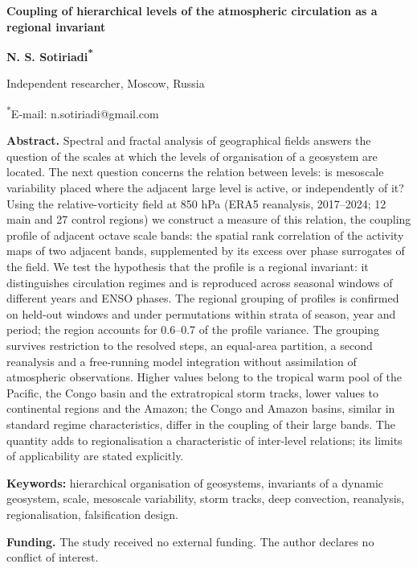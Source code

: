 \documentclass[12pt,a4paper]{article}
\begin{document}
\clearpage
\begin{center}
{\large\bfseries Coupling of hierarchical levels of the atmospheric circulation as a regional invariant}

\medskip
{\bfseries N. S. Sotiriadi\textsuperscript{*}}

Independent researcher, Moscow, Russia

\textsuperscript{*}E-mail: n.sotiriadi@gmail.com
\end{center}

\begin{singlespace}
\noindent\textbf{Abstract.} Spectral and fractal analysis of geographical fields answers the question of the scales at which the levels of organisation of a geosystem are located. The next question concerns the relation between levels: is mesoscale variability placed where the adjacent large level is active, or independently of it? Using the relative-vorticity field at 850 hPa (ERA5 reanalysis, 2017--2024; 12 main and 27 control regions) we construct a measure of this relation, the coupling profile of adjacent octave scale bands: the spatial rank correlation of the activity maps of two adjacent bands, supplemented by its excess over phase surrogates of the field. We test the hypothesis that the profile is a regional invariant: it distinguishes circulation regimes and is reproduced across seasonal windows of different years and ENSO phases. The regional grouping of profiles is confirmed on held-out windows and under permutations within strata of season, year and period; the region accounts for 0.6--0.7 of the profile variance. The grouping survives restriction to the resolved steps, an equal-area partition, a second reanalysis and a free-running model integration without assimilation of atmospheric observations. Higher values belong to the tropical warm pool of the Pacific, the Congo basin and the extratropical storm tracks, lower values to continental regions and the Amazon; the Congo and Amazon basins, similar in standard regime characteristics, differ in the coupling of their large bands. The quantity adds to regionalisation a characteristic of inter-level relations; its limits of applicability are stated explicitly.

\smallskip
\noindent\textbf{Keywords:} hierarchical organisation of geosystems, invariants of a dynamic geosystem, scale, mesoscale variability, storm tracks, deep convection, reanalysis, regionalisation, falsification design.

\smallskip
\noindent\textbf{Funding.} The study received no external funding. The author declares no conflict of interest.
\end{singlespace}
\end{document}
